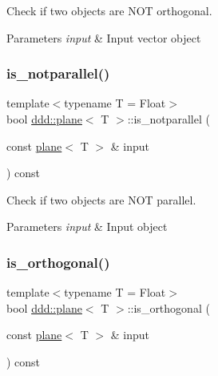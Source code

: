 Check if two objects are N\+OT orthogonal. 


\begin{DoxyParams}{Parameters}
{\em input} & Input vector object \\
\hline
\end{DoxyParams}
\mbox{\label{classddd_1_1plane_a43d2c86ea24af8c084623632326f18a0}} 
\subsubsection{\texorpdfstring{is\+\_\+notparallel()}{is\_notparallel()}}
{\footnotesize\ttfamily template$<$typename T = Float$>$ \\
bool \hyperlink{classddd_1_1plane}{ddd\+::plane}$<$ T $>$\+::is\+\_\+notparallel (\begin{DoxyParamCaption}\item[{const \hyperlink{classddd_1_1plane}{plane}$<$ T $>$ \&}]{input }\end{DoxyParamCaption}) const\hspace{0.3cm}{\ttfamily [inline]}}



Check if two objects are N\+OT parallel. 


\begin{DoxyParams}{Parameters}
{\em input} & Input object \\
\hline
\end{DoxyParams}
\mbox{\label{classddd_1_1plane_a385d3ae184ada014ea95e8139a0995d0}} 
\subsubsection{\texorpdfstring{is\+\_\+orthogonal()}{is\_orthogonal()}}
{\footnotesize\ttfamily template$<$typename T = Float$>$ \\
bool \hyperlink{classddd_1_1plane}{ddd\+::plane}$<$ T $>$\+::is\+\_\+orthogonal (\begin{DoxyParamCaption}\item[{const \hyperlink{classddd_1_1plane}{plane}$<$ T $>$ \&}]{input }\end{DoxyParamCaption}) const\hspace{0.3cm}{\ttfamily [inline]}}



